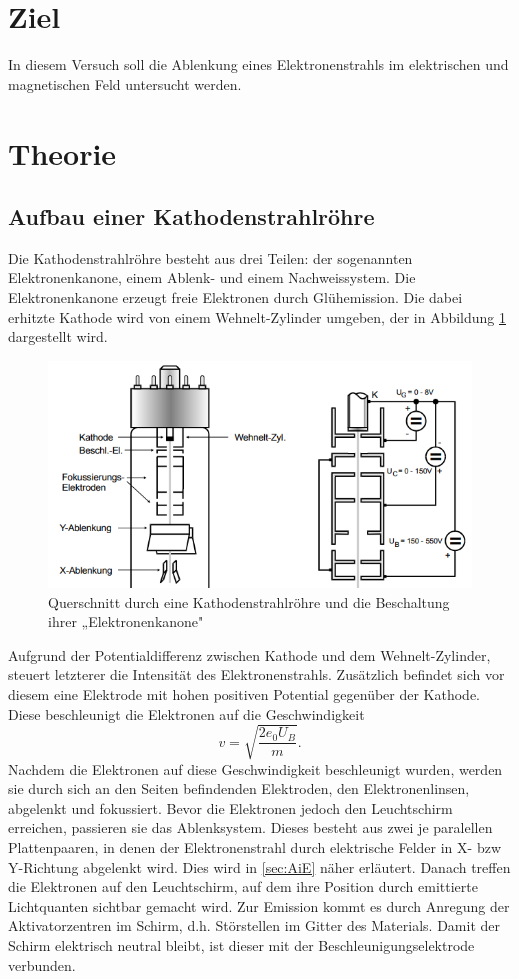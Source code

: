 
\section{Ziel}
In diesem Versuch soll die Ablenkung eines Elektronenstrahls im elektrischen und magnetischen Feld untersucht werden.
\section{Theorie}
\subsection{Aufbau einer Kathodenstrahlröhre}
Die Kathodenstrahlröhre besteht aus drei Teilen: der sogenannten Elektronenkanone, einem Ablenk- und einem Nachweissystem.
Die Elektronenkanone erzeugt freie Elektronen durch Glühemission.
Die dabei erhitzte Kathode wird von einem Wehnelt-Zylinder umgeben, der in Abbildung \ref{fig:WZ} dargestellt wird.
\begin{figure}[H]
  \centering
  \includegraphics[width=\linewidth-100pt,height=\textheight-100pt,keepaspectratio]{Text/Bilder/Kathodenstrahlroehre.png}
  \caption{Querschnitt durch eine Kathodenstrahlröhre und die Beschaltung ihrer „Elektronenkanone" \cite[82]{sample}}
  \label{fig:WZ}
\end{figure}
Aufgrund der Potentialdifferenz zwischen Kathode und dem Wehnelt-Zylinder, steuert letzterer die Intensität des Elektronenstrahls.
Zusätzlich befindet sich vor diesem eine Elektrode mit hohen positiven Potential gegenüber der Kathode. Diese beschleunigt die Elektronen auf die Geschwindigkeit
\begin{equation}
  v=\sqrt{\frac{2 e_0 U_B}{m}} \text{.} \label{eqn:vnk}
\end{equation}
Nachdem die Elektronen auf diese Geschwindigkeit beschleunigt wurden, werden sie durch sich an den Seiten befindenden Elektroden, den Elektronenlinsen, abgelenkt und fokussiert.
Bevor die Elektronen jedoch den Leuchtschirm erreichen, passieren sie das Ablenksystem. Dieses besteht aus zwei je paralellen Plattenpaaren, in denen der Elektronenstrahl durch elektrische Felder in X- bzw Y-Richtung
abgelenkt wird. Dies wird in \ref{sec:AiE} näher erläutert.
Danach treffen die Elektronen auf den Leuchtschirm, auf dem ihre Position durch emittierte Lichtquanten sichtbar gemacht wird. Zur Emission kommt es durch Anregung der Aktivatorzentren im Schirm, d.h. Störstellen im Gitter
des Materials. Damit der Schirm elektrisch neutral bleibt, ist dieser mit der Beschleunigungselektrode verbunden.
